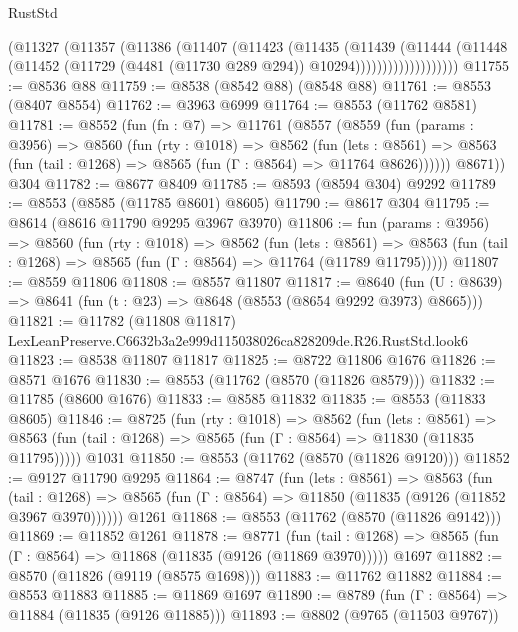 \begin{lexlean}{RustStd}
\begin{coremodule}
                    (@11327
                      (@11357
                        (@11386
                          (@11407
                            (@11423
                              (@11435
                                (@11439
                                  (@11444
                                    (@11448
                                      (@11452
                                        (@11729 (@4481 (@11730 @289 @294)) @10294)))))))))))))))))))
@11755 := @8536 @88
@11759 := @8538 (@8542 @88) (@8548 @88)
@11761 := @8553 (@8407 @8554)
@11762 := @3963 @6999
@11764 := @8553 (@11762 @8581)
@11781 := @8552
    (fun (fn : @7) =>
    @11761
      (@8557
        (@8559
          (fun (params : @3956) =>
          @8560
            (fun (rty : @1018) =>
            @8562
              (fun (lets : @8561) =>
              @8563 (fun (tail : @1268) => @8565 (fun (Γ : @8564) => @11764 @8626))))))
        @8671))
    @304
@11782 := @8677 @8409
@11785 := @8593 (@8594 @304) @9292
@11789 := @8553 (@8585 (@11785 @8601) @8605)
@11790 := @8617 @304
@11795 := @8614 (@8616 @11790 @9295 @3967 @3970)
@11806 := fun (params : @3956) =>
  @8560
    (fun (rty : @1018) =>
    @8562
      (fun (lets : @8561) =>
      @8563 (fun (tail : @1268) => @8565 (fun (Γ : @8564) => @11764 (@11789 @11795)))))
@11807 := @8559 @11806
@11808 := @8557 @11807
@11817 := @8640
    (fun (U : @8639) => @8641 (fun (t : @23) => @8648 (@8553 (@8654 @9292 @3973) @8665)))
@11821 := @11782 (@11808 @11817) LexLeanPreserve.C6632b3a2e999d115038026ca828209de.R26.RustStd.look6
@11823 := @8538 @11807 @11817
@11825 := @8722 @11806 @1676
@11826 := @8571 @1676
@11830 := @8553 (@11762 (@8570 (@11826 @8579)))
@11832 := @11785 (@8600 @1676)
@11833 := @8585 @11832
@11835 := @8553 (@11833 @8605)
@11846 := @8725
    (fun (rty : @1018) =>
    @8562
      (fun (lets : @8561) =>
      @8563 (fun (tail : @1268) => @8565 (fun (Γ : @8564) => @11830 (@11835 @11795)))))
    @1031
@11850 := @8553 (@11762 (@8570 (@11826 @9120)))
@11852 := @9127 @11790 @9295
@11864 := @8747
    (fun (lets : @8561) =>
    @8563
      (fun (tail : @1268) =>
      @8565 (fun (Γ : @8564) => @11850 (@11835 (@9126 (@11852 @3967 @3970))))))
    @1261
@11868 := @8553 (@11762 (@8570 (@11826 @9142)))
@11869 := @11852 @1261
@11878 := @8771
    (fun (tail : @1268) => @8565 (fun (Γ : @8564) => @11868 (@11835 (@9126 (@11869 @3970)))))
    @1697
@11882 := @8570 (@11826 (@9119 (@8575 @1698)))
@11883 := @11762 @11882
@11884 := @8553 @11883
@11885 := @11869 @1697
@11890 := @8789 (fun (Γ : @8564) => @11884 (@11835 (@9126 @11885)))
@11893 := @8802 (@9765 (@11503 @9767))

\end{coremodule}
\end{lexlean}
